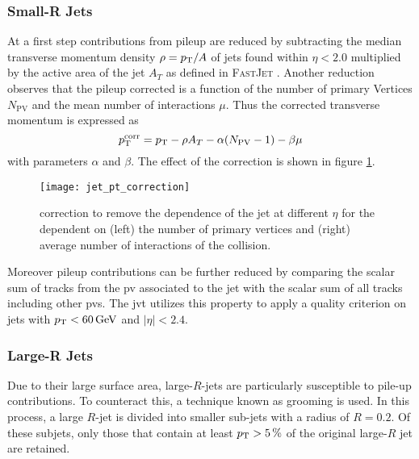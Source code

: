 \subsubsection{Small-R Jets}
At a first step contributions from pileup are reduced by subtracting the median transverse momentum density $\rho=p_{\text{T}} / A$ of jets found within $\eta<2.0$ multiplied by the active area of the jet $A_T$ as defined in \textsc{FastJet} \citep{cacciari2012fastjet}. Another reduction observes that the pileup corrected \pt is a function of the number of primary Vertices $N_\text{PV}$ and the mean number of interactions $\mu$. Thus the corrected transverse momentum is expressed as
\begin{equation}
  p_{\text{T}}^\text{corr}=p_{\text{T}}-\rho A_T -\alpha(N_\text{PV}-1)-\beta\mu
\end{equation}
with parameters $\alpha$ and $\beta$. The effect of the correction is shown in figure \ref{fig:jet_pt_correction}.
\begin{figure}
  \centering
  \texttt{[image: jet\_pt\_correction]}
  \caption[]{\pt correction to remove the \pt dependence of the jet at different $\eta$ for the \pt dependent on (left) the number of primary vertices and (right) average number of interactions of the collision.}
  \label{fig:jet_pt_correction}
\end{figure}

Moreover pileup contributions can be further reduced by comparing the scalar \pt sum of tracks from the \ac{pv} associated to the jet with the scalar \pt sum of all tracks including other \acp{pv}. The \ac{jvt} \citep{ATLAS-CONF-2014-018} utilizes this property to apply a quality criterion on jets with $p_{\text{T}}<\qty[]{60}{GeV}$ and $|\eta|<2.4$.


\subsubsection{Large-R Jets}
Due to their large surface area, large-$R$-jets are particularly susceptible to pile-up contributions. To counteract this, a technique known as grooming is used. In this process, a large $R$-jet is divided into smaller sub-jets with a radius of $R=0.2$. Of these subjets, only those that contain at least $p_{\text{T}}>\qty[]{5}{\percent}$ of the original large-$R$ jet are retained.

